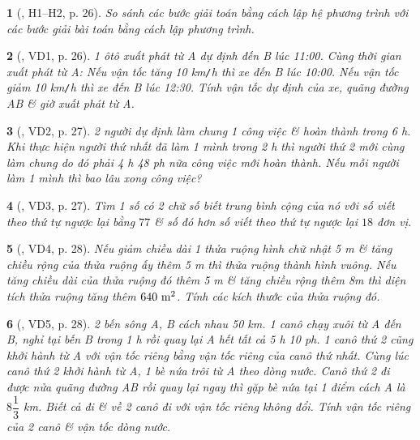 \documentclass{article}
\newtheorem{baitoan}{}
\begin{document}
\begin{baitoan}[\cite{Binh_boi_duong_Toan_9_tap_2}, H1--H2, p. 26]
	So sánh các bước giải toán bằng cách lập hệ phương trình với các bước giải bài toán bằng cách lập phương trình.
\end{baitoan}

\begin{baitoan}[\cite{Binh_boi_duong_Toan_9_tap_2}, VD1, p. 26]
	1 ôtô xuất phát từ A dự định đến B lúc {\rm11:00}. Cùng thời gian xuất phát từ A: Nếu vận tốc tăng {\rm10 km{\tt/}h} thì xe đến B lúc {\rm10:00}. Nếu vận tốc giảm {\rm10 km{\tt/}h} thì xe đến B lúc {\rm12:30}. Tính vận tốc dự định của xe, quãng đường AB \& giờ xuất phát từ A.
\end{baitoan}

\begin{baitoan}[\cite{Binh_boi_duong_Toan_9_tap_2}, VD2, p. 27]
	2 người dự định làm chung 1 công việc \& hoàn thành trong {\rm6 h}. Khi thực hiện người thứ nhất đã làm 1 mình trong {\rm2 h} thì người thứ 2 mới cùng làm chung do đó phải {\rm4 h 48 ph} nữa công việc mới hoàn thành. Nếu mỗi người làm 1 mình thì bao lâu xong công việc?
\end{baitoan}

\begin{baitoan}[\cite{Binh_boi_duong_Toan_9_tap_2}, VD3, p. 27]
	Tìm 1 số có 2 chữ số biết trung bình cộng của nó với số viết theo thứ tự ngược lại bằng $77$ \& số đó hơn số viết theo thứ tự ngược lại $18$ đơn vị.
\end{baitoan}

\begin{baitoan}[\cite{Binh_boi_duong_Toan_9_tap_2}, VD4, p. 28]
	Nếu giảm chiều dài 1 thửa ruộng hình chữ nhật {\rm5 m} \& tăng chiều rộng của thửa ruộng ấy thêm {\rm5 m} thì thửa ruộng thành hình vuông. Nếu tăng chiều dài của thửa ruộng đó thêm {\rm5 m} \& tăng chiều rộng thêm {\rm 8m} thì diện tích thửa ruộng tăng thêm $\rm640\ m^2$. Tính các kích thước của thửa ruộng đó.
\end{baitoan}

\begin{baitoan}[\cite{Binh_boi_duong_Toan_9_tap_2}, VD5, p. 28]
	2 bến sông A, B cách nhau {\rm50 km}. 1 canô chạy xuôi từ A đến B, nghỉ tại bến B trong {\rm1 h} rồi quay lại A hết tất cả {\rm5 h 10 ph}. 1 canô thứ 2 cũng khởi hành từ A với vận tốc riêng bằng vận tốc riêng của canô thứ nhất. Cùng lúc canô thứ 2 khởi hành từ A, 1 bè nứa trôi từ A theo dòng nước. Canô thứ 2 đi được nửa quãng đường AB rồi quay lại ngay thì gặp bè nứa tại 1 điểm cách A là $8\dfrac{1}{3}$ {\rm km}. Biết cả đi \& về 2 canô đi với vận tốc riêng không đổi. Tính vận tốc riêng của 2 canô \& vận tốc dòng nước.
\end{baitoan}
\end{document}
